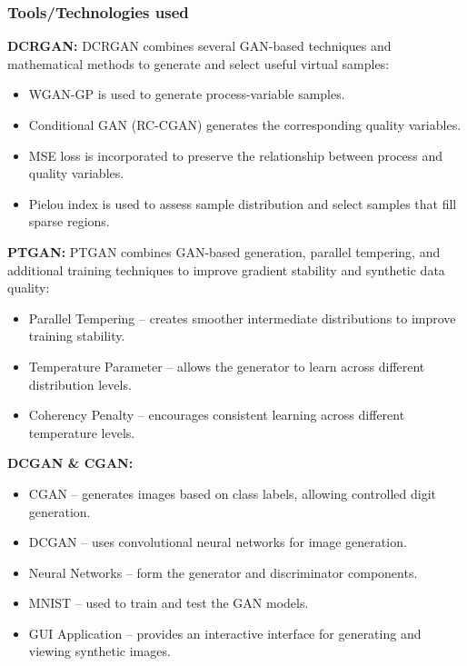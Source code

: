 \documentclass[12pt,a4paper]{article}
\begin{document}
\subsubsection{Tools/Technologies used}
\textbf{DCRGAN:} DCRGAN combines several GAN-based techniques and mathematical methods to generate and select useful virtual samples:
\begin{itemize}
    \item WGAN-GP is used to generate process-variable samples.
    \item Conditional GAN (RC-CGAN) generates the corresponding quality variables.
    \item MSE loss is incorporated to preserve the relationship between process and quality variables.
    \item Pielou index is used to assess sample distribution and select samples that fill sparse regions.
\end{itemize}
\textbf{PTGAN:} PTGAN combines GAN-based generation, parallel tempering, and additional training techniques to improve gradient stability and synthetic data quality:
\begin{itemize}
    \item Parallel Tempering – creates smoother intermediate distributions to improve training stability.
    \item Temperature Parameter – allows the generator to learn across different distribution levels.
    \item Coherency Penalty – encourages consistent learning across different temperature levels.
\end{itemize}
\textbf{DCGAN \& CGAN:}
\begin{itemize}
    \item CGAN – generates images based on class labels, allowing controlled digit generation.
    \item DCGAN – uses convolutional neural networks for image generation.
    \item Neural Networks – form the generator and discriminator components.
    \item MNIST – used to train and test the GAN models.
    \item GUI Application – provides an interactive interface for generating and viewing synthetic images.
\end{itemize}
\end{document}
